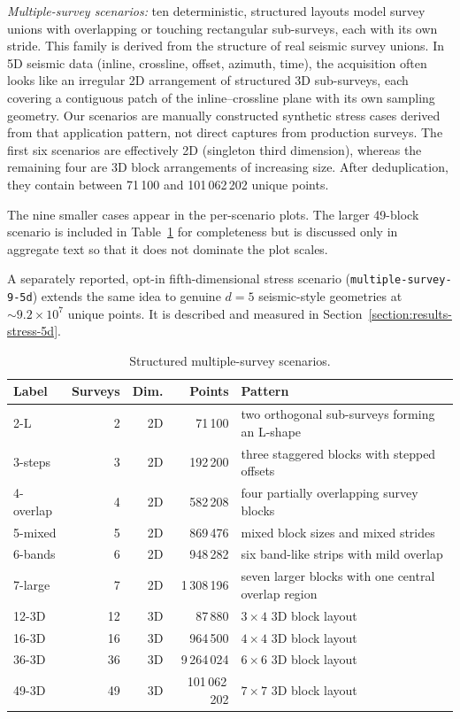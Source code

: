 \documentclass[manuscript,screen,review]{acmart}
\theoremstyle{definition}
\theoremstyle{plain}
\begin{document}
\emph{Multiple-survey scenarios:}
ten deterministic, structured layouts model survey unions with overlapping or touching
rectangular sub-surveys, each with its own stride.
This family is derived from the structure of real seismic survey
unions. In 5D seismic data (inline, crossline, offset, azimuth, time),
the acquisition often looks like an irregular 2D arrangement of
structured 3D sub-surveys, each covering a contiguous patch of the
inline--crossline plane with its own sampling geometry. Our scenarios
are manually constructed synthetic stress cases derived from that
application pattern, not direct captures from production surveys.
The first six scenarios are effectively 2D (singleton third dimension),
whereas the remaining four are 3D block arrangements of increasing
size.
After deduplication, they contain between 71\,100 and
101\,062\,202 unique points.

The nine smaller cases appear in the per-scenario plots. The larger
49-block scenario is included in
Table~\ref{table:structured-scenarios} for completeness but is
discussed only in aggregate text so that it does not dominate the plot
scales.

A separately reported, opt-in fifth-dimensional stress scenario
(\texttt{multiple-survey-9-5d}) extends the same idea to genuine
$d=5$ seismic-style geometries at $\sim\!9.2\times 10^7$ unique points.
It is described and measured in
Section~\ref{section:results-stress-5d}.

\begin{table}[ht]
\centering
\caption{Structured multiple-survey scenarios.}
\label{table:structured-scenarios}
\small
\begin{tabular}{lrrrp{7cm}}
\toprule
Label & Surveys & Dim. & Points & Pattern \\
\midrule
2-L
  & 2 & 2D & 71\,100
  & two orthogonal sub-surveys forming an L-shape \\
3-steps
  & 3 & 2D & 192\,200
  & three staggered blocks with stepped offsets \\
4-overlap
  & 4 & 2D & 582\,208
  & four partially overlapping survey blocks \\
5-mixed
  & 5 & 2D & 869\,476
  & mixed block sizes and mixed strides \\
6-bands
  & 6 & 2D & 948\,282
  & six band-like strips with mild overlap \\
7-large
  & 7 & 2D & 1\,308\,196
  & seven larger blocks with one central overlap region \\
12-3D
  & 12 & 3D & 87\,880
  & $3\times4$ 3D block layout \\
16-3D
  & 16 & 3D & 964\,500
  & $4\times4$ 3D block layout \\
36-3D
  & 36 & 3D & 9\,264\,024
  & $6\times6$ 3D block layout \\
49-3D
  & 49 & 3D & 101\,062\,202
  & $7\times7$ 3D block layout \\
\bottomrule
\end{tabular}
\end{table}
\end{document}
